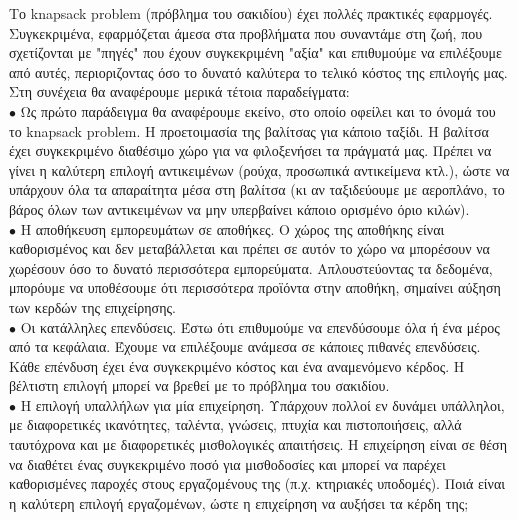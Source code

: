 \documentclass[12pt]{article}
\begin{document}
Το knapsack problem (πρόβλημα του σακιδίου) έχει πολλές πρακτικές εφαρμογές. Συγκεκριμένα, εφαρμόζεται άμεσα  στα προβλήματα που συναντάμε στη ζωή, που σχετίζονται με "πηγές" που έχουν συγκεκριμένη "αξία" και επιθυμούμε να επιλέξουμε από αυτές, περιοριζοντας όσο το δυνατό καλύτερα το τελικό κόστος της επιλογής μας.\\

Στη συνέχεια θα αναφέρουμε μερικά τέτοια παραδείγματα: \\
\(\bullet\) Ως πρώτο παράδειγμα θα αναφέρουμε εκείνο, στο οποίο οφείλει και το όνομά του το knapsack problem. Η προετοιμασία της βαλίτσας για κάποιο ταξίδι. Η βαλίτσα έχει συγκεκριμένο διαθέσιμο χώρο για να φιλοξενήσει τα πράγματά μας. Πρέπει να γίνει η καλύτερη επιλογή αντικειμένων (ρούχα, προσωπικά αντικείμενα κτλ.), ώστε να υπάρχουν όλα τα απαραίτητα μέσα στη βαλίτσα (κι αν ταξιδεύουμε με αεροπλάνο, το βάρος όλων των αντικειμένων να μην υπερβαίνει κάποιο ορισμένο όριο κιλών). \\

\(\bullet\) Η αποθήκευση εμπορευμάτων σε αποθήκες. Ο χώρος της αποθήκης είναι καθορισμένος και δεν μεταβάλλεται και πρέπει σε αυτόν το χώρο να μπορέσουν να χωρέσουν όσο το δυνατό περισσότερα εμπορεύματα. Απλουστεύοντας τα δεδομένα, μπορόυμε να υποθέσουμε ότι περισσότερα προϊόντα στην αποθήκη, σημαίνει αύξηση των κερδών της επιχείρησης. \\

\(\bullet\) Οι κατάλληλες επενδύσεις. Έστω  ότι επιθυμούμε να επενδύσουμε όλα ή ένα  μέρος  από τα κεφάλαια. Έχουμε να επιλέξουμε ανάμεσα  σε κάποιες πιθανές επενδύσεις. Κάθε επένδυση έχει ένα συγκεκριμένο κόστος και ένα αναμενόμενο κέρδος. Η βέλτιστη επιλογή μπορεί να βρεθεί με το πρόβλημα του σακιδίου. \\ 

\(\bullet\) Η επιλογή υπαλλήλων για μία επιχείρηση. Υπάρχουν πολλοί εν δυνάμει υπάλληλοι, με διαφορετικές ικανότητες, ταλέντα, γνώσεις, πτυχία και πιστοποιήσεις, αλλά ταυτόχρονα και με διαφορετικές μισθολογικές απαιτήσεις. Η επιχείρηση είναι σε θέση να διαθέτει ένας συγκεκριμένο ποσό για μισθοδοσίες και μπορεί να παρέχει καθορισμένες παροχές στους εργαζομένους της (π.χ. κτηριακές υποδομές). Ποιά είναι η καλύτερη επιλογή εργαζομένων, ώστε η επιχείρηση να αυξήσει τα κέρδη της; \\
\end{document}
